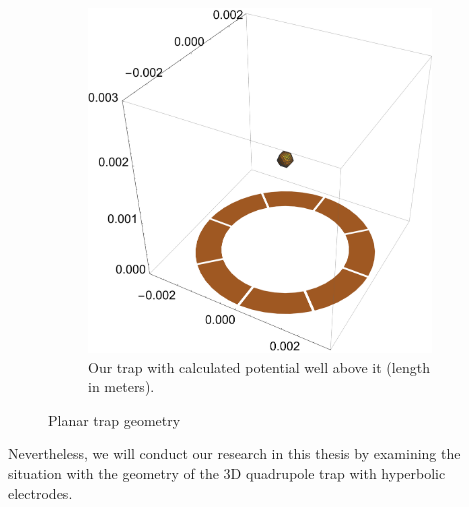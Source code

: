 \begin{figure}[H]
\begin{subfigure}{.5\textwidth}
  \includegraphics[width=\linewidth]{img/real_trap_geometry_2.pdf}  
  \caption{Our trap with calculated potential well above it (length in meters).}
  \label{fig:Real trap geometry 2}
\end{subfigure}
\caption{Planar trap geometry}
\label{fig:planar trap geometry}
\end{figure}
Nevertheless, we will conduct our research in this thesis by examining the situation with the geometry of the 3D quadrupole trap with hyperbolic electrodes.

